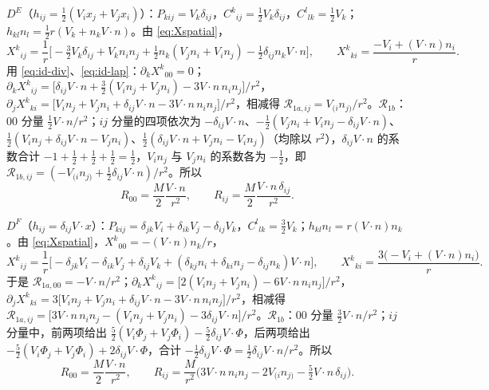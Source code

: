 \documentclass[11pt,a4paper]{ctexart}
\numberwithin{equation}{section}
\begin{document}
$D^E$（$h_{ij}=\tfrac12(V_ix_j+V_jx_i)$）：$P_{kij}=V_k\delta_{ij}$，$C^k{}_{ij}=\tfrac12V_k\delta_{ij}$，$C^l{}_{lk}=\tfrac12V_k$；$h_{kl}n_l=\tfrac12r(V_k+n_kV\!\cdot n)$。由 \eqref{eq:Xspatial}，
\begin{equation*}
X^k{}_{ij}=\frac1r\Big[-\tfrac32V_k\delta_{ij}+V_kn_in_j+\tfrac12n_k(V_jn_i+V_in_j)-\tfrac12\delta_{ij}n_kV\!\cdot n\Big],\qquad X^k{}_{ki}=\frac{-V_i+(V\!\cdot n)n_i}{r}.
\end{equation*}
用 \eqref{eq:id-div}、\eqref{eq:id-lap}：$\partial_kX^k{}_{00}=0$；$\partial_kX^k{}_{ij}=\big[\delta_{ij}V\!\cdot n+\tfrac32(V_in_j+V_jn_i)-3V\!\cdot n\,n_in_j\big]/r^2$，$\partial_jX^k{}_{ki}=\big[V_in_j+V_jn_i+\delta_{ij}V\!\cdot n-3V\!\cdot n\,n_in_j\big]/r^2$，相减得 $\mathcal R_{1a,ij}=V_{(i}n_{j)}/r^2$。$\mathcal R_{1b}$：$00$ 分量 $\tfrac12V\!\cdot n/r^2$；$ij$ 分量的四项依次为 $-\delta_{ij}V\!\cdot n$、$-\tfrac12(V_jn_i+V_in_j-\delta_{ij}V\!\cdot n)$、$\tfrac12(V_in_j+\delta_{ij}V\!\cdot n-V_jn_i)$、$\tfrac12(\delta_{ij}V\!\cdot n+V_jn_i-V_in_j)$（均除以 $r^2$），$\delta_{ij}V\!\cdot n$ 的系数合计 $-1+\tfrac12+\tfrac12+\tfrac12=\tfrac12$，$V_in_j$ 与 $V_jn_i$ 的系数各为 $-\tfrac12$，即 $\mathcal R_{1b,ij}=(-V_{(i}n_{j)}+\tfrac12\delta_{ij}V\!\cdot n)/r^2$。所以
\begin{equation*}
R_{00}=\frac{M}{2}\frac{V\!\cdot n}{r^2},\qquad R_{ij}=\frac M{2}\frac{V\!\cdot n\,\delta_{ij}}{r^2}.
\end{equation*}

$D^F$（$h_{ij}=\delta_{ij}V\!\cdot x$）：$P_{kij}=\delta_{jk}V_i+\delta_{ik}V_j-\delta_{ij}V_k$，$C^l{}_{lk}=\tfrac32V_k$；$h_{kl}n_l=r(V\!\cdot n)n_k$。由 \eqref{eq:Xspatial}，$X^k{}_{00}=-(V\!\cdot n)n_k/r$，
\begin{equation*}
X^k{}_{ij}=\frac1r\big[-\delta_{jk}V_i-\delta_{ik}V_j+\delta_{ij}V_k+(\delta_{kj}n_i+\delta_{ki}n_j-\delta_{ij}n_k)V\!\cdot n\big],\qquad X^k{}_{ki}=\frac{3\big(-V_i+(V\!\cdot n)n_i\big)}{r}.
\end{equation*}
于是 $\mathcal R_{1a,00}=-V\!\cdot n/r^2$；$\partial_kX^k{}_{ij}=\big[2(V_in_j+V_jn_i)-6V\!\cdot n\,n_in_j\big]/r^2$，$\partial_jX^k{}_{ki}=3\big[V_in_j+V_jn_i+\delta_{ij}V\!\cdot n-3V\!\cdot n\,n_in_j\big]/r^2$，相减得 $\mathcal R_{1a,ij}=\big[3V\!\cdot n\,n_in_j-(V_in_j+V_jn_i)-3\delta_{ij}V\!\cdot n\big]/r^2$。$\mathcal R_{1b}$：$00$ 分量 $\tfrac32V\!\cdot n/r^2$；$ij$ 分量中，前两项给出 $\tfrac52(V_i\Phi_j+V_j\Phi_i)-\tfrac52\delta_{ij}V\!\cdot\Phi$，后两项给出 $-\tfrac52(V_i\Phi_j+V_j\Phi_i)+2\delta_{ij}V\!\cdot\Phi$，合计 $-\tfrac12\delta_{ij}V\!\cdot\Phi=\tfrac12\delta_{ij}V\!\cdot n/r^2$。所以
\begin{equation*}
R_{00}=\frac{M}{2}\frac{V\!\cdot n}{r^2},\qquad
R_{ij}=\frac M{r^2}\Big(3V\!\cdot n\,n_in_j-2V_{(i}n_{j)}-\tfrac52V\!\cdot n\,\delta_{ij}\Big).
\end{equation*}
\end{document}
